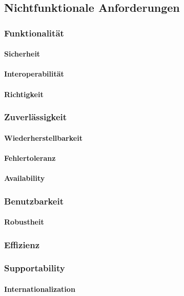 \subsection{Nichtfunktionale Anforderungen}
\subsubsection{Funktionalität}
\paragraph{Sicherheit}
\paragraph{Interoperabilität}
\paragraph{Richtigkeit}
\subsubsection{Zuverlässigkeit}
\paragraph{Wiederherstellbarkeit}
\paragraph{Fehlertoleranz}
\paragraph{Availability}
\subsubsection{Benutzbarkeit}
\paragraph{Robustheit}
\subsubsection{Effizienz}
\subsubsection{Supportability}
\paragraph{Internationalization}

